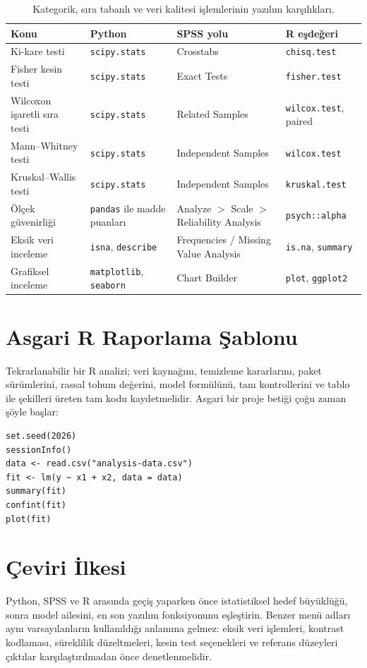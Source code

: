 \begin{table}[htbp]
\centering
\caption{Kategorik, sıra tabanlı ve veri kalitesi işlemlerinin yazılım karşılıkları.}
\begingroup\scriptsize
\begin{tabular}{@{}p{}p{}p{}p{}@{}}
\toprule
\textbf{Konu} & \textbf{Python} & \textbf{SPSS yolu} & \textbf{R eşdeğeri} \\
\midrule
Ki-kare testi & \texttt{scipy.stats} & Crosstabs & \texttt{chisq.test} \\
Fisher kesin testi & \texttt{scipy.stats} & Exact Tests & \texttt{fisher.test} \\
Wilcoxon işaretli sıra testi & \texttt{scipy.stats} & Related Samples & \texttt{wilcox.test}, paired \\
Mann--Whitney testi & \texttt{scipy.stats} & Independent Samples & \texttt{wilcox.test} \\
Kruskal--Wallis testi & \texttt{scipy.stats} & Independent Samples & \texttt{kruskal.test} \\
Ölçek güvenirliği & \texttt{pandas} ile madde puanları & Analyze $>$ Scale $>$ Reliability Analysis & \texttt{psych::alpha} \\
Eksik veri inceleme & \texttt{isna}, \texttt{describe} & Frequencies / Missing Value Analysis & \texttt{is.na}, \texttt{summary} \\
Grafiksel inceleme & \texttt{matplotlib}, \texttt{seaborn} & Chart Builder & \texttt{plot}, \texttt{ggplot2} \\
\bottomrule
\end{tabular}
\endgroup
\end{table}

\section*{Asgari R Raporlama Şablonu}

Tekrarlanabilir bir R analizi; veri kaynağını, temizleme kararlarını, paket sürümlerini, rassal tohum değerini, model formülünü, tanı kontrollerini ve tablo ile şekilleri üreten tam kodu kaydetmelidir. Asgari bir proje betiği çoğu zaman şöyle başlar:

\begin{lstlisting}
set.seed(2026)
sessionInfo()
data <- read.csv("analysis-data.csv")
fit <- lm(y ~ x1 + x2, data = data)
summary(fit)
confint(fit)
plot(fit)
\end{lstlisting}

\section*{Çeviri İlkesi}

Python, SPSS ve R arasında geçiş yaparken önce istatistiksel hedef büyüklüğü, sonra model ailesini, en son yazılım fonksiyonunu eşleştirin. Benzer menü adları aynı varsayılanların kullanıldığı anlamına gelmez: eksik veri işlemleri, kontrast kodlaması, süreklilik düzeltmeleri, kesin test seçenekleri ve referans düzeyleri çıktılar karşılaştırılmadan önce denetlenmelidir.